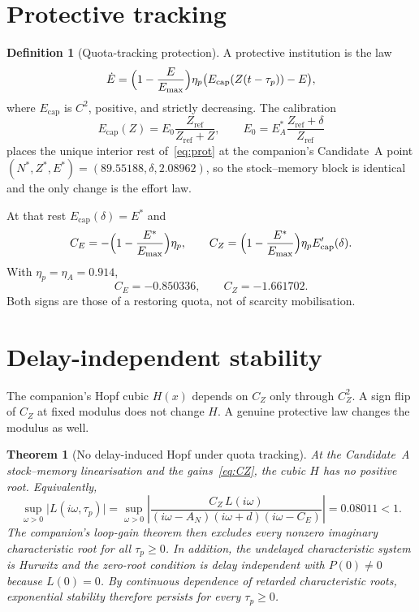 \documentclass[11pt]{article}
\newtheorem{theorem}{Theorem}
\theoremstyle{definition}
\newtheorem{definition}{Definition}
\begin{document}
\section{Protective tracking}

\begin{definition}[Quota-tracking protection]
\label{def:prot}
A protective institution is the law
\begin{equation}
\dot E=\Bigl(1-\frac{E}{E_{\max}}\Bigr)\eta_p\bigl(E_{\mathrm{cap}}(Z(t-\tau_p))-E\bigr),
\label{eq:prot}
\end{equation}
where $E_{\mathrm{cap}}$ is $C^2$, positive, and strictly decreasing. The calibration
\begin{equation}
E_{\mathrm{cap}}(Z)=E_0\frac{Z_{\mathrm{ref}}}{Z_{\mathrm{ref}}+Z},\qquad
E_0=E^*_A\frac{Z_{\mathrm{ref}}+\delta}{Z_{\mathrm{ref}}}
\label{eq:cap}
\end{equation}
places the unique interior rest of~\eqref{eq:prot} at the companion's Candidate~A point $(N^*,Z^*,E^*)=(89.55188,\delta,2.08962)$, so the stock--memory block is identical and the only change is the effort law.
\end{definition}

At that rest $E_{\mathrm{cap}}(\delta)=E^*$ and
\begin{equation}
C_E=-\Bigl(1-\frac{E^*}{E_{\max}}\Bigr)\eta_p,\qquad
C_Z=\Bigl(1-\frac{E^*}{E_{\max}}\Bigr)\eta_p E_{\mathrm{cap}}'(\delta).
\label{eq:CZ}
\end{equation}
With $\eta_p=\eta_A=0.914$,
\[
C_E=-0.850336,\qquad C_Z=-1.661702.
\]
Both signs are those of a restoring quota, not of scarcity mobilisation.

\section{Delay-independent stability}

The companion's Hopf cubic $H(x)$ depends on $C_Z$ only through $C_Z^2$. A sign flip of $C_Z$ at fixed modulus does not change $H$. A genuine protective law changes the modulus as well.

\begin{theorem}[No delay-induced Hopf under quota tracking]
\label{thm:nohopf}
At the Candidate~A stock--memory linearisation and the gains~\eqref{eq:CZ}, the cubic $H$ has no positive root. Equivalently,
\[
\sup_{\omega>0}\bigl|L(i\omega,\tau_p)\bigr|
=\sup_{\omega>0}\left|\frac{C_Z\,L(i\omega)}{(i\omega-A_N)(i\omega+d)(i\omega-C_E)}\right|
=0.08011<1.
\]
The companion's loop-gain theorem then excludes every nonzero imaginary characteristic root for all $\tau_p\ge 0$. In addition, the undelayed characteristic system is Hurwitz and the zero-root condition is delay independent with $P(0)\ne0$ because $L(0)=0$. By continuous dependence of retarded characteristic roots, exponential stability therefore persists for every $\tau_p\ge0$.
\end{theorem}
\end{document}
